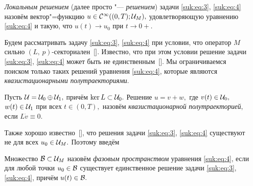  {\it Локальным решением} (далее просто  "---  {\it решением}) задачи \eqref{suk:eq:3}, \eqref{suk:eq:4} назовём вектор"=функцию 
 $u \in {\cal C}^{\infty }((0, T); {\cal U}_M),$ удовлетворяющую уравнению \eqref{suk:eq:4} и такую, что $u(t) \to u_0$ при $t \to 0+$.

Будем рассматривать задачу \eqref{suk:eq:3}, \eqref{suk:eq:4} при условии, что  оператор $M$ сильно $(L,~p)$-секториален~[].
Известно, что при этом условии решение задачи \eqref{suk:eq:3}, \eqref{suk:eq:4}  может быть не единственным~[]. 
Мы ограничиваемся поиском только таких решений уравнения \eqref{suk:eq:4}, которые являются {\it квазистационарными полутраекториями}.

\begin{definition}[1]
 Пусть  ${\cal U}={\cal U}_0\oplus {\cal U}_1,$ причём  $\ker L \subset {\cal U}_0.$ 
 Решение $u=v+w,$ где $v(t)\in {\cal U}_0,$   $w(t) \in {\cal U}_1$ при всех $t \in (0,T),$   назовём    {\it квазистационарной полутраекторией}, если $L \dot v \equiv 0.$
\end{definition}


Также хорошо известно~[], что решения задачи \eqref{suk:eq:3}, \eqref{suk:eq:4} существуют не для всех $u_0 \in  {\cal{U}}_M.$
Поэтому введём

 \begin{definition}[2] Множество ${\cal{B}}\subset{\cal U}_M$ назовём {\it фазовым пространством} уравнения \eqref{suk:eq:4}, если для любой точки $u_0
\in {\cal B}$ существует единственное решение задачи \eqref{suk:eq:3}, \eqref{suk:eq:4}, причём $u(t) \in{\cal{B}}.$
\end{definition}


